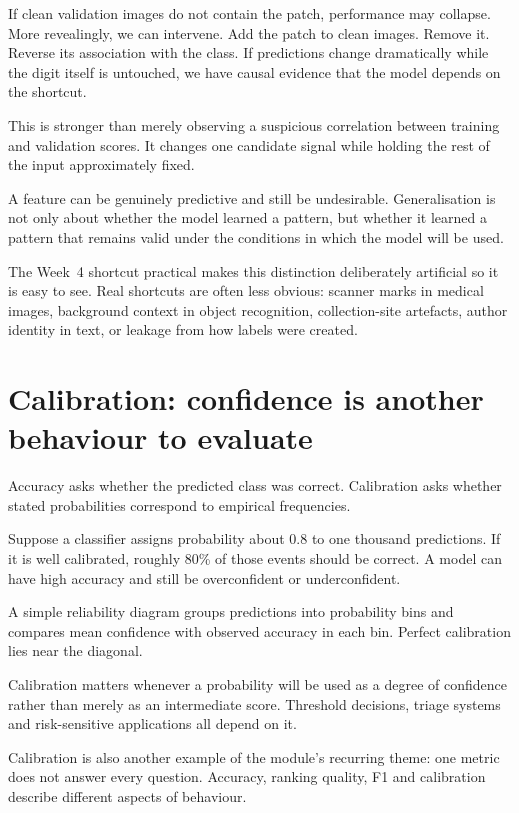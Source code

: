 If clean validation images do not contain the patch, performance may collapse. More revealingly, we can intervene. Add the patch to clean images. Remove it. Reverse its association with the class. If predictions change dramatically while the digit itself is untouched, we have causal evidence that the model depends on the shortcut.

This is stronger than merely observing a suspicious correlation between training and validation scores. It changes one candidate signal while holding the rest of the input approximately fixed.

\begin{keyidea}
A feature can be genuinely predictive and still be undesirable. Generalisation is not only about whether the model learned a pattern, but whether it learned a pattern that remains valid under the conditions in which the model will be used.
\end{keyidea}

The Week~4 shortcut practical makes this distinction deliberately artificial so it is easy to see. Real shortcuts are often less obvious: scanner marks in medical images, background context in object recognition, collection-site artefacts, author identity in text, or leakage from how labels were created.

\section{Calibration: confidence is another behaviour to evaluate}

Accuracy asks whether the predicted class was correct. Calibration asks whether stated probabilities correspond to empirical frequencies.

Suppose a classifier assigns probability about \(0.8\) to one thousand predictions. If it is well calibrated, roughly 80\% of those events should be correct. A model can have high accuracy and still be overconfident or underconfident.

A simple reliability diagram groups predictions into probability bins and compares mean confidence with observed accuracy in each bin. Perfect calibration lies near the diagonal.

Calibration matters whenever a probability will be used as a degree of confidence rather than merely as an intermediate score. Threshold decisions, triage systems and risk-sensitive applications all depend on it.

Calibration is also another example of the module's recurring theme: one metric does not answer every question. Accuracy, ranking quality, F1 and calibration describe different aspects of behaviour.

